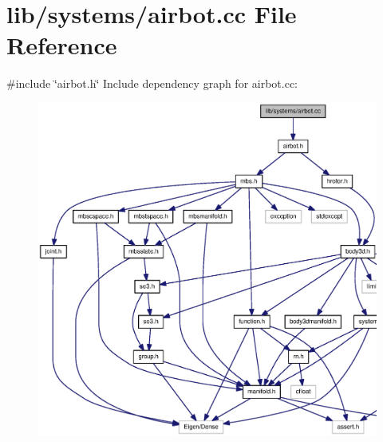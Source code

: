\section{lib/systems/airbot.cc \-File \-Reference}
\label{airbot_8cc}
{\ttfamily \#include \char`\"{}airbot.\-h\char`\"{}}\*
\-Include dependency graph for airbot.\-cc\-:\nopagebreak
\begin{figure}[H]
\begin{center}
\leavevmode
\includegraphics[width=350pt]{airbot_8cc__incl}
\end{center}
\end{figure}
